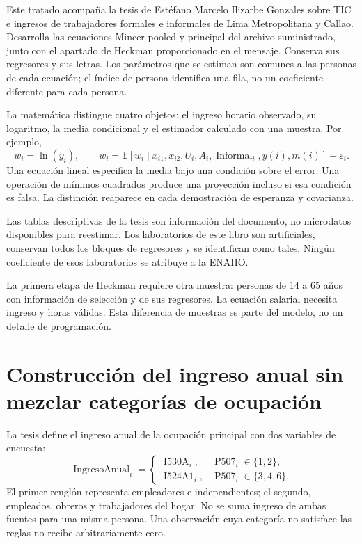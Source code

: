 \documentclass[11pt,a4paper]{article}
\newcommand{\E}{\mathbb E}
\begin{document}
Este tratado acompaña la tesis de Estéfano Marcelo Ilizarbe Gonzales sobre TIC e ingresos de trabajadores formales e informales de Lima Metropolitana y Callao. Desarrolla las ecuaciones Mincer pooled y principal del archivo suministrado, junto con el apartado de Heckman proporcionado en el mensaje. Conserva sus regresores y sus letras. Los parámetros que se estiman son comunes a las personas de cada ecuación; el índice de persona identifica una fila, no un coeficiente diferente para cada persona.

La matemática distingue cuatro objetos: el ingreso horario observado, su logaritmo, la media condicional y el estimador calculado con una muestra. Por ejemplo,
\[
w_i=\ln(y_i),\qquad
w_i=\E[w_i\mid x_{i1},x_{i2},U_i,A_i,\operatorname{Informal}_i,y(i),m(i)]+\varepsilon_i.
\]
Una ecuación lineal especifica la media bajo una condición sobre el error. Una operación de mínimos cuadrados produce una proyección incluso si esa condición es falsa. La distinción reaparece en cada demostración de esperanza y covarianza.

Las tablas descriptivas de la tesis son información del documento, no microdatos disponibles para reestimar. Los laboratorios de este libro son artificiales, conservan todos los bloques de regresores y se identifican como tales. Ningún coeficiente de esos laboratorios se atribuye a la ENAHO.

La primera etapa de Heckman requiere otra muestra: personas de 14 a 65 años con información de selección y de sus regresores. La ecuación salarial necesita ingreso y horas válidas. Esta diferencia de muestras es parte del modelo, no un detalle de programación.

\clearpage
\section{Construcción del ingreso anual sin mezclar categorías de ocupación}

La tesis define el ingreso anual de la ocupación principal con dos variables de encuesta:
\[
\operatorname{IngresoAnual}_i=
\begin{cases}
\operatorname{I530A}_i,&\operatorname{P507}_i\in\{1,2\},\\
\operatorname{I524A1}_i,&\operatorname{P507}_i\in\{3,4,6\}.
\end{cases}
\]
El primer renglón representa empleadores e independientes; el segundo, empleados, obreros y trabajadores del hogar. No se suma ingreso de ambas fuentes para una misma persona. Una observación cuya categoría no satisface las reglas no recibe arbitrariamente cero.
\end{document}
